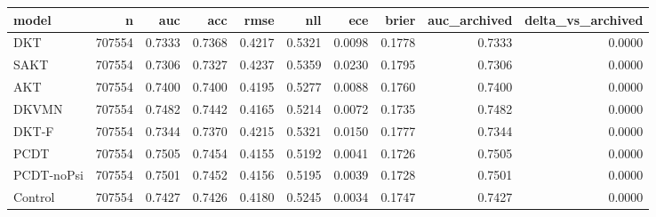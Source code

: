 \begin{tabular}{lrrrrrrrrr}
\toprule
model & n & auc & acc & rmse & nll & ece & brier & auc\_archived & delta\_vs\_archived \\
\midrule
DKT & 707554 & 0.7333 & 0.7368 & 0.4217 & 0.5321 & 0.0098 & 0.1778 & 0.7333 & 0.0000 \\
SAKT & 707554 & 0.7306 & 0.7327 & 0.4237 & 0.5359 & 0.0230 & 0.1795 & 0.7306 & 0.0000 \\
AKT & 707554 & 0.7400 & 0.7400 & 0.4195 & 0.5277 & 0.0088 & 0.1760 & 0.7400 & 0.0000 \\
DKVMN & 707554 & 0.7482 & 0.7442 & 0.4165 & 0.5214 & 0.0072 & 0.1735 & 0.7482 & 0.0000 \\
DKT-F & 707554 & 0.7344 & 0.7370 & 0.4215 & 0.5321 & 0.0150 & 0.1777 & 0.7344 & 0.0000 \\
PCDT & 707554 & 0.7505 & 0.7454 & 0.4155 & 0.5192 & 0.0041 & 0.1726 & 0.7505 & 0.0000 \\
PCDT-noPsi & 707554 & 0.7501 & 0.7452 & 0.4156 & 0.5195 & 0.0039 & 0.1728 & 0.7501 & 0.0000 \\
Control & 707554 & 0.7427 & 0.7426 & 0.4180 & 0.5245 & 0.0034 & 0.1747 & 0.7427 & 0.0000 \\
\bottomrule
\end{tabular}
